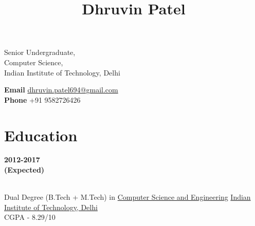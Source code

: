 \documentclass[10pt]{article} %
\begin{document}
\title{Dhruvin Patel } %

\parbox{0.5\textwidth}{ %
Senior Undergraduate, \\
 Computer Science, \\
 Indian Institute of Technology, Delhi

}
\parbox{0.5\textwidth}{
{\bf Email} \hspace{0.535cm} \href{mailto:dhruvin.patel694@gmail.com}{dhruvin.patel694@gmail.com}  \\ %
{\bf Phone} \hspace{0.45cm} +91 9582726426
}




\section{Education}

\parbox{0.13\textwidth}{ %
\bf{2012-2017}\\
\bf{(Expected)}\\\\

}
\parbox{0.67\textwidth}{
Dual Degree (B.Tech + M.Tech) in \href{http://www.cse.iitd.ernet.in} {Computer Science and Engineering}
\href{http://www.iitd.ernet.in} {Indian Institute of Technology, Delhi}\\
CGPA - 8.29/10\\
}

\end{document}
